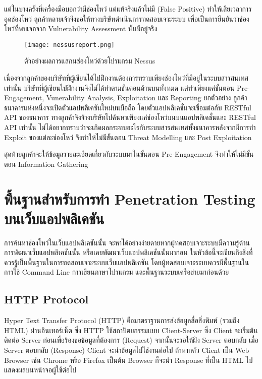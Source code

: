 แต่ในบางครั้งที่เครื่องมือบอกว่ามีช่องโหว่ แต่แท้จริงแล้วไม่มี (False Positive) ทำให้เสียเวลาการอุดช่องโหว่ ลูกค้าหลายเจ้าจึงขอให้ทางบริษัทดำเนินการทดสอบเจาะระบบ เพื่อเป็นการยืนยันว่าช่องโหว่ที่พบเจอจาก Vulnerability Assessment นั้นมีอยู่จริง

\begin{figure}[h]
	\centering
	\texttt{[image: nessusreport.png]}
	\caption{ตัวอย่างผลการแสกนช่องโหว่ด้วยโปรแกรม Nessus}
	\label{Fig:nessusreport}
\end{figure}

เนื่องจากลูกค้าของบริษัทที่ผู้เขียนได้ไปฝึกงานต้องการทราบเพียงช่องโหว่ที่มีอยู่ในระบบสารสนเทศเท่านั้น บริษัทที่ผู้เขียนไปฝึกงานจึงไม่ได้ทำตามขั้นตอนด้านบนทั้งหมด  แต่ทำเพียงแค่ขั้นตอน Pre-Engagement, Vunerability Analysis, Exploitation และ Reporting  ยกตัวอย่าง ลูกค้าธนาคารแห่งหนึ่งจะเปิดตัวแอปพลิเคชันใหม่บนมือถือ โดยตัวแอปพลิเคชั่นจะเชื่อมต่อกับ RESTful API ของธนาคาร ทางลูกค้าจึงจ้างบริษัทไปค้นหาเพียงแค่ช่องโหว่บนบนแอปพลิเคชั่นและ RESTful API เท่านั้น ไม่ได้อยากทราบว่าจะเกิดผลกระทบอะไรกับระบบสารสนเทศทั้งธนาคารหลังจากมีการทำ Exploit ของแต่ละช่องโหว่ จึงทำให้ไม่มีขั้นตอน Threat Modelling และ Post Exploitation

สุดท้ายลูกค้าจะให้ข้อมูลรายละเอียดเกี่ยวกับระบบมาในขั้นตอน Pre-Engagement จึงทำให้ไม่มีขั้นตอน Information Gathering

\section{พื้นฐานสำหรับการทำ Penetration Testing บนเว็บแอปพลิเคชัน}

การค้นหาช่องโหว่ในเว็บแอปพลิเคชันนั้น จะหาได้อย่างง่ายดายหากผู้ทดสอบเจาะระบบมีความรู้ด้านการพัฒนาเว็บแอปพลิเคชันนั้น หรือเคยพัฒนาเว็บแอปพลิเคชันนั้นมาก่อน ในหัวข้อนี้จะเขียนถึงสิ่งที่ควรรู้เป็นพื้นฐานในการทดสอบเจาะระบบเว็บแอปพลิเคชัน โดยผู้ทดสอบเจาะระบบควรมีพื้นฐานในการใช้ Command Line การเขียนภาษาโปรแกรม และพื้นฐานระบบเครือข่ายมาก่อนด้วย

\subsection{HTTP Protocol}

Hyper Text Transfer Protocol (HTTP) คือมาตราฐานการส่งข้อมูลสื่อสิ่งพิมพ์ (รวมถึง HTML) ผ่านอินเทอร์เน็ต ซึ่ง HTTP  ใช้สถาปัตยกรรมแบบ Client-Server \cite{https://developer.mozilla.org/en-US/docs/Web/HTTP/Overview} ซึ่ง Client จะเริ่มต้นติดต่อ Server ก่อนเพื่อร้องขอข้อมูลที่ต้องการ (Request) จากนั้นจะรอให้ฝั่ง Server ตอบกลับ เมื่อ Server ตอบกลับ (Response) Client จะนำข้อมูลไปใช้งานต่อไป ถ้าหากตัว Client เป็น Web Browser เช่น Chrome หรือ Firefox เป็นต้น Browser ก็จะนำ Response ที่เป็น HTML ไปแสดงผลบนหน้าจอผู้ใช้ต่อไป \cite{https://developer.mozilla.org/en-US/docs/Web/HTTP/Messages} 


